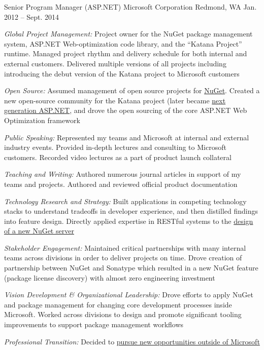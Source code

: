\begin{cventries}
\cventry 
{Senior Program Manager (ASP.NET)}
{Microsoft Corporation}
{Redmond, WA}
{Jan. 2012 – Sept. 2014}
{ %
\begin{cvitems}
\item {\emph{Global Project Management:} Project owner for the NuGet package management system, ASP.NET Web-optimization code library, and the “Katana Project” runtime. Managed project rhythm and delivery schedule for both internal and external customers. Delivered multiple versions of all projects including introducing the debut version of the Katana project to Microsoft customers }
\item {\emph{Open Source:}  Assumed management of open source projects for \href{https://github.com/NuGet}{NuGet}. Created a new open-source community for the Katana project (later became \href{https://github.com/aspnet/GetStarted}{next generation ASP.NET}, and drove the open sourcing of the core ASP.NET Web Optimization framework }
\item {\emph{Public Speaking:} Represented my teams and Microsoft at internal and external industry events. Provided in-depth lectures and consulting to Microsoft customers. Recorded video lectures as a part of product launch collateral }
\item {\emph{Teaching and Writing:} Authored numerous journal articles in support of my teams and projects. Authored and reviewed official product documentation }
\item {\emph{Technology Research and Strategy:} Built applications in competing technology stacks to understand tradeoffs in developer experience, and then distilled findings into feature design. Directly applied expertise in RESTful systems to the \href{https://docs.nuget.org/ndocs/api/nuget-api-v3}{design of a new NuGet server} }
\item {\emph{Stakeholder Engagement:} Maintained critical partnerships with many internal teams across divisions in order to deliver projects on time. Drove creation of partnership between NuGet and Sonatype which resulted in a new NuGet feature (package license discovery) with almost zero engineering investment }
\item {\emph{Vision Development \& Organizational Leadership:} Drove efforts to apply NuGet and package management for changing core development processes inside Microsoft. Worked across divisions to design and promote significant tooling improvements to support package management workflows }
\item {\emph{Professional Transition:} Decided to \href{https://www.howarddierking.com/2014/08/14/leaving-microsoft/}{pursue new opportunities outside of Microsoft} }
\end{cvitems}
}


\end{cventries}
